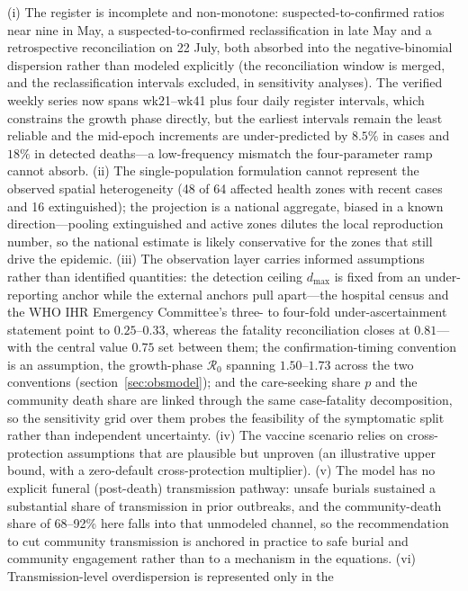 \documentclass[preprint,12pt,numbers]{elsarticle}
\newcommand{\Reff}{\mathcal{R}}
\begin{document}
(i) The register is incomplete and non-monotone: suspected-to-confirmed
ratios near nine in May, a suspected-to-confirmed reclassification in
late May and a retrospective reconciliation on 22 July, both absorbed
into the negative-binomial dispersion rather than modeled explicitly
(the reconciliation window is merged, and the reclassification intervals
excluded, in sensitivity analyses). The verified weekly series now spans
wk21--wk41 plus four daily register intervals, which constrains the
growth phase directly, but the earliest intervals remain the least
reliable and the mid-epoch increments are under-predicted by $8.5\%$ in
cases and $18\%$ in detected deaths---a low-frequency mismatch the
four-parameter ramp cannot absorb.
(ii) The single-population formulation cannot represent the observed
spatial heterogeneity (48 of 64 affected health zones with recent cases
and 16 extinguished); the projection is a national
aggregate, biased in a known direction---pooling extinguished and active
zones dilutes the local reproduction number, so the national estimate is
likely conservative for the zones that still drive the epidemic. (iii)
The observation layer carries informed assumptions rather than
identified quantities: the detection ceiling $d_{\max}$ is fixed from an
under-reporting anchor while the external anchors pull apart---the
hospital census and the WHO IHR Emergency Committee's three- to
four-fold under-ascertainment statement  point to
$0.25$--$0.33$, whereas the fatality reconciliation closes at $0.81$---
with the central value $0.75$ set between them; the
confirmation-timing convention is an assumption, the growth-phase
$\Reff_0$ spanning $1.50$--$1.73$ across the two conventions
(section~\ref{sec:obsmodel}); and the
care-seeking share $p$ and the community death share are linked through
the same case-fatality decomposition, so the sensitivity grid over them
probes the feasibility of the symptomatic split rather than independent
uncertainty. (iv) The vaccine scenario relies on cross-protection
assumptions that are plausible but unproven (an illustrative upper
bound, with a zero-default cross-protection multiplier). (v) The model
has no explicit funeral (post-death) transmission pathway: unsafe
burials sustained a substantial share of transmission in prior
outbreaks, and the community-death share of 68--92\% here falls into
that unmodeled channel, so the recommendation to cut community
transmission is anchored in practice to safe burial and community
engagement rather than to a mechanism in the equations. (vi)
Transmission-level overdispersion is represented only in the
\end{document}

